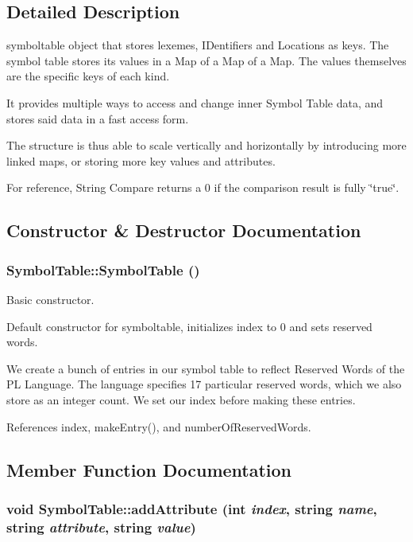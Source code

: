 \subsection{Detailed Description}
symboltable object that stores lexemes, IDentifiers and Locations as keys. The symbol table stores its values in a Map of a Map of a Map. The values themselves are the specific keys of each kind.

It provides multiple ways to access and change inner Symbol Table data, and stores said data in a fast access form.

The structure is thus able to scale vertically and horizontally by introducing more linked maps, or storing more key values and attributes.

For reference, String Compare returns a 0 if the comparison result is fully \char`\"{}true\char`\"{}. 

\subsection{Constructor \& Destructor Documentation}
\hypertarget{classSymbolTable_a1fbe6cec5594463b766db0ac58c9aa1d}{
\subsubsection[{SymbolTable}]{\setlength{\rightskip}{0pt plus 5cm}SymbolTable::SymbolTable ()}}
\label{classSymbolTable_a1fbe6cec5594463b766db0ac58c9aa1d}


Basic constructor. 

Default constructor for symboltable, initializes index to 0 and sets reserved words.

We create a bunch of entries in our symbol table to reflect Reserved Words of the PL Language. The language specifies 17 particular reserved words, which we also store as an integer count. We set our index before making these entries. 

References index, makeEntry(), and numberOfReservedWords.



\subsection{Member Function Documentation}
\hypertarget{classSymbolTable_ac7a86e820025627863b4277cf84353a0}{
\subsubsection[{addAttribute}]{\setlength{\rightskip}{0pt plus 5cm}void SymbolTable::addAttribute (int {\em index}, \/  string {\em name}, \/  string {\em attribute}, \/  string {\em value})}}
\label{classSymbolTable_ac7a86e820025627863b4277cf84353a0}


